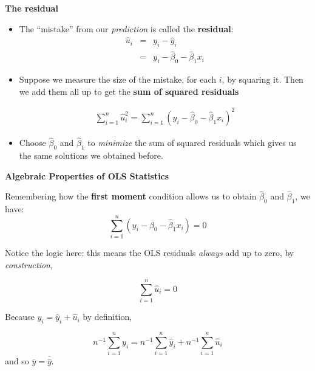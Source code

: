 \documentclass[notes=show]{beamer}
\begin{document}
\begin{frame}[plain]
\begin{center}
\textbf{The residual}
\end{center}

 \begin{itemize}
  
  \item The ``mistake'' from our \emph{prediction} is called the \textbf{residual}:
   \begin{eqnarray*}
    \hat{u}_{i}&=&y_{i}-\hat{y}_{i} \\
    &=&y_{i}-\hat{\beta}_{0}-\hat{\beta}_{1}x_{i}
   \end{eqnarray*}
\item    Suppose we measure the size of the mistake, for each $i$, by squaring it. Then we add them all up to get the \textbf{sum of squared residuals}

   \begin{eqnarray*}
    \sum_{i=1}^{n}\hat{u}_{i}^{2}=\sum_{i=1}^{n}(y_{i}-\hat{\beta}_{0}-\hat{\beta}_{1}x_{i})^{2}
   \end{eqnarray*}
\item   Choose $\hat{\beta}_{0}$ and $\hat{\beta}_{1}$ to \textit{minimize} the sum of squared residuals which gives us the same solutions we obtained before.
 \end{itemize}
\end{frame}





\begin{frame}[plain]
 \textbf{Algebraic Properties of OLS Statistics}

 Remembering how the \textbf{first moment} condition allows us to obtain $\hat{\beta}_{0}$ and $\hat{\beta}_{1}$, we have:
 \begin{equation}
  \sum_{i=1}^{n}(y_{i}-\hat{\beta}_{0}-\hat{\beta}_{1}x_{i})=0
 \end{equation}
   
 Notice the logic here: this means the OLS residuals \textit{always} add up to zero, by \textit{construction},
   
  \begin{equation}
   \sum_{i=1}^{n}\hat{u}_{i}=0
  \end{equation}
  
   Because $y_{i}=\hat{y}_{i}+\hat{u}_{i}$ by definition,

 \begin{equation}
  n^{-1}\sum_{i=1}^{n}y_{i}=n^{-1}\sum_{i=1}^{n}\hat{y}_{i}+n^{-1}\sum_{i=1}^{n}\hat{u}_{i}
 \end{equation}
 and so $\overline{y}=\overline{\hat{y}}$.


\end{frame}
\end{document}
